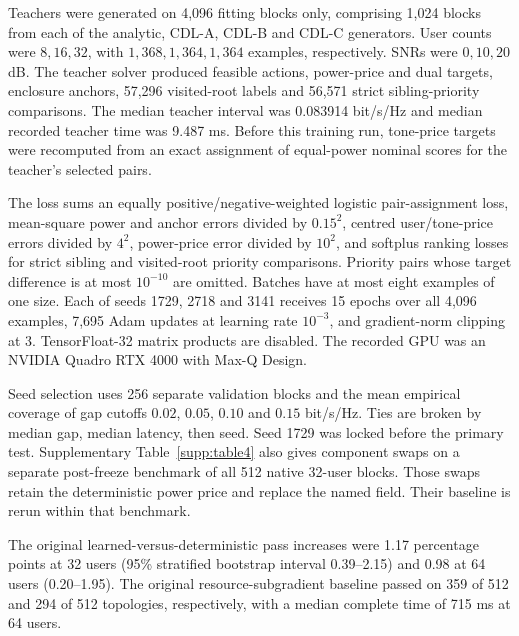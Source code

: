 Teachers were generated on 4,096 fitting blocks only, comprising 1,024
blocks from each of the analytic, CDL-A, CDL-B and CDL-C generators.
User counts were \(8,16,32\), with \(1,368,1,364,1,364\) examples,
respectively. SNRs were \(0,10,20\) dB. The teacher solver produced
feasible actions, power-price and dual targets, enclosure anchors, 57,296
visited-root labels and 56,571 strict sibling-priority comparisons.
The median teacher interval was 0.083914 bit/s/Hz and median recorded
teacher time was 9.487 ms. Before this training run, tone-price targets
were recomputed from an exact assignment of equal-power nominal scores
for the teacher's selected pairs.

The loss sums an equally positive/negative-weighted logistic pair-assignment
loss, mean-square power and anchor errors divided by \(0.15^2\), centred
user/tone-price errors divided by \(4^2\), power-price error divided by
\(10^2\), and softplus ranking losses for strict sibling and visited-root
priority comparisons. Priority pairs whose target difference is at most
\(10^{-10}\) are omitted. Batches have at most eight examples of one size.
Each of seeds 1729, 2718 and 3141 receives 15 epochs over all 4,096 examples,
7,695 Adam updates at learning rate \(10^{-3}\), and gradient-norm clipping
at 3. TensorFloat-32 matrix products are disabled.
The recorded GPU was an NVIDIA Quadro RTX 4000 with Max-Q Design.

Seed selection uses 256 separate validation blocks and the mean empirical
coverage of gap cutoffs \(0.02\), \(0.05\), \(0.10\) and \(0.15\) bit/s/Hz. Ties are broken
by median gap, median latency, then seed. Seed 1729 was locked before
the primary test. Supplementary Table~\ref{supp:table4} also gives component swaps on a
separate post-freeze benchmark of all 512 native 32-user blocks.
Those swaps retain the deterministic power price and replace the named
field. Their baseline is rerun within that benchmark.

The original learned-versus-deterministic pass increases were 1.17 percentage points at 32 users (95\% stratified bootstrap interval 0.39--2.15) and 0.98 at 64 users (0.20--1.95). The original resource-subgradient baseline passed on 359 of 512 and 294 of 512 topologies, respectively, with a median complete time of 715 ms at 64 users.

